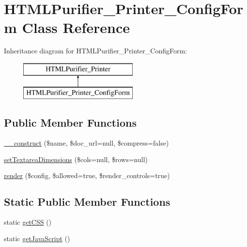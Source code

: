 \hypertarget{classHTMLPurifier__Printer__ConfigForm}{\section{H\+T\+M\+L\+Purifier\+\_\+\+Printer\+\_\+\+Config\+Form Class Reference}
\label{classHTMLPurifier__Printer__ConfigForm}
}
Inheritance diagram for H\+T\+M\+L\+Purifier\+\_\+\+Printer\+\_\+\+Config\+Form\+:\begin{figure}[H]
\begin{center}
\leavevmode
\includegraphics[height=2.000000cm]{classHTMLPurifier__Printer__ConfigForm}
\end{center}
\end{figure}
\subsection*{Public Member Functions}
\begin{DoxyCompactItemize}
\item 
\hyperlink{classHTMLPurifier__Printer__ConfigForm_a765666bf175868a7f90c6803cc0ef079}{\+\_\+\+\_\+construct} (\$name, \$doc\+\_\+url=null, \$compress=false)
\item 
\hyperlink{classHTMLPurifier__Printer__ConfigForm_a020d81a2a8f274adc30791dcf69274e1}{set\+Textarea\+Dimensions} (\$cols=null, \$rows=null)
\item 
\hyperlink{classHTMLPurifier__Printer__ConfigForm_a0267a0da9cff9c3f2d310ddab0db854b}{render} (\$config, \$allowed=true, \$render\+\_\+controls=true)
\end{DoxyCompactItemize}
\subsection*{Static Public Member Functions}
\begin{DoxyCompactItemize}
\item 
static \hyperlink{classHTMLPurifier__Printer__ConfigForm_a39057a2a44210a7cc7e0efe6df5f0ef7}{get\+C\+S\+S} ()
\item 
static \hyperlink{classHTMLPurifier__Printer__ConfigForm_aa79131278798b9b425a95b2f92402aee}{get\+Java\+Script} ()
\end{DoxyCompactItemize}
